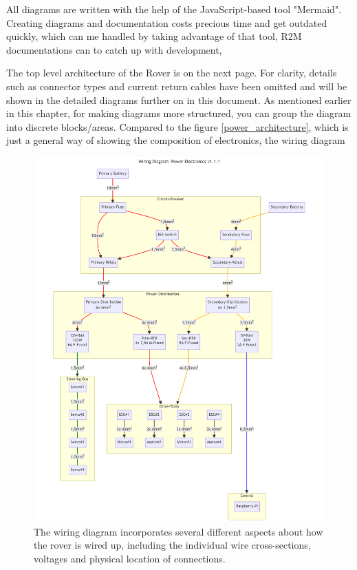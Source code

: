     \vspace{5mm} %

    All diagrams are written with the help of the JavaScript-based tool "Mermaid". Creating diagrams and documentation costs precious time and get outdated quickly, which can me handled  by taking advantage of that tool, R2M documentations can to catch up with development, 

    The top level architecture of the Rover is on the next page. For clarity, details such as connector types and current return cables have been omitted and will be shown in the detailed diagrams further on in this document. As mentioned earlier in this chapter, for making diagrams more structured, you can group the diagram into discrete blocks/areas. Compared to the figure \ref{power_architecture}, which is just a general way of showing the composition of electronics, the wiring diagram 

    \begin{figure}[ht!]
        \centering
        \includegraphics[width=1\textwidth]{contents/figures/wiring-diagram-p-v1.1.1.png}
        \caption{The wiring diagram incorporates several different aspects about how the rover is wired up, including the individual wire cross-sections, voltages and physical location of connections.}
        \label{wiring_power}
    \end{figure}

